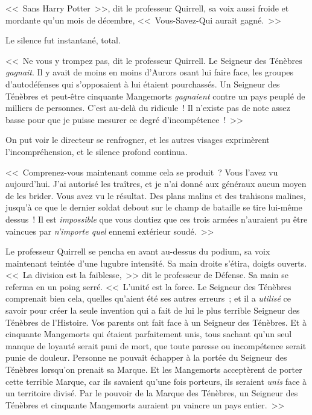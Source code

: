 <<~Sans Harry Potter~>>, dit le professeur Quirrell, sa voix aussi froide et mordante qu'un mois de décembre, <<~Vous-Savez-Qui aurait gagné.~>>

Le silence fut instantané, total.

\later

<<~Ne vous y trompez pas, dit le professeur Quirrell. Le Seigneur des Ténèbres \emph{gagnait}. Il y avait de moins en moins d'Aurors osant lui faire face, les groupes d'autodéfenses qui s'opposaient à lui étaient pourchassés. Un Seigneur des Ténèbres et peut-être cinquante Mangemorts \emph{gagnaient} contre un pays peuplé de milliers de personnes. C'est au-delà du ridicule~! Il n'existe pas de note assez basse pour que je puisse mesurer ce degré d'incompétence~!~>>

On put voir le directeur se renfrogner, et les autres visages exprimèrent l'incompréhension, et le silence profond continua.

<<~Comprenez-vous maintenant comme cela se produit~? Vous l'avez vu aujourd'hui. J'ai autorisé les traîtres, et je n'ai donné aux généraux aucun moyen de les brider. Vous avez vu le résultat. Des plans malins et des trahisons malines, jusqu'à ce que le dernier soldat debout sur le champ de bataille se tire lui-même dessus~! Il est \emph{impossible} que vous doutiez que ces trois armées n'auraient pu être vaincues par \emph{n'importe quel} ennemi extérieur soudé.~>>

Le professeur Quirrell se pencha en avant au-dessus du podium, sa voix maintenant teintée d'une lugubre intensité. Sa main droite s'étira, doigts ouverts. <<~La division est la faiblesse,~>> dit le professeur de Défense. Sa main se referma en un poing serré. <<~L'unité est la force. Le Seigneur des Ténèbres comprenait bien cela, quelles qu'aient été ses autres erreurs~; et il a \emph{utilisé} ce savoir pour créer la seule invention qui a fait de lui le plus terrible Seigneur des Ténèbres de l'Histoire. Vos parents ont fait face à un Seigneur des Ténèbres. Et à cinquante Mangemorts qui étaient parfaitement unis, tous sachant qu'un seul manque de loyauté serait puni de mort, que toute paresse ou incompétence serait punie de douleur. Personne ne pouvait échapper à la portée du Seigneur des Ténèbres lorsqu'on prenait sa Marque. Et les Mangemorts acceptèrent de porter cette terrible Marque, car ils savaient qu'une fois porteurs, ils seraient \emph{unis} face à un territoire divisé. Par le pouvoir de la Marque des Ténèbres, un Seigneur des Ténèbres et cinquante Mangemorts auraient pu vaincre un pays entier.~>>

